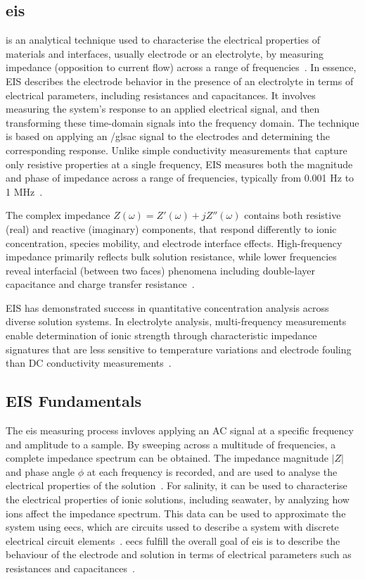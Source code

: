 \subsection{\gls{eis}}

 is an analytical technique used to characterise the electrical properties of materials and interfaces, usually electrode or an electrolyte, by measuring impedance (opposition to current flow) across a range of frequencies~\cite{canales_electrochemical_2021}.
In essence, EIS describes the electrode behavior in the presence of an electrolyte in terms of electrical parameters, including resistances and capacitances.
It involves measuring the system's response to an applied electrical signal, and then transforming these time-domain signals into the frequency domain.
The technique is based on applying an /gls{ac} signal to the electrodes and determining the corresponding response.
Unlike simple conductivity measurements that capture only resistive properties at a single frequency, EIS measures both the magnitude and phase of impedance across a range of frequencies, typically from 0.001 Hz to 1 MHz~\cite{barsoukov_impedance_2005}.

The complex impedance $Z(\omega)=Z'(\omega)+jZ''(\omega)$ contains both resistive (real) and reactive (imaginary) components, that respond differently to ionic concentration, species mobility, and electrode interface effects.
High-frequency impedance primarily reflects bulk solution resistance, while lower frequencies reveal interfacial (between two faces) phenomena including double-layer capacitance and charge transfer resistance~\cite{orazem_electrochemical_2008}.

EIS has demonstrated success in quantitative concentration analysis across diverse solution systems.
In electrolyte analysis, multi-frequency measurements enable determination of ionic strength through characteristic impedance signatures that are less sensitive to temperature variations and electrode fouling than DC conductivity measurements~\cite{barsoukov_impedance_2005}.


\subsection{EIS Fundamentals}
The \gls{eis} measuring process invloves applying an AC signal at a specific frequency and amplitude to a sample.
By sweeping across a multitude of frequencies, a complete impedance spectrum can be obtained.
The impedance magnitude $|Z|$ and phase angle $\phi$ at each frequency is recorded, and are used to analyse the electrical properties of the solution~\cite{orazem_electrochemical_2008}.
For salinity, it can be used to characterise the electrical properties of ionic solutions, including seawater, by analyzing how ions affect the impedance spectrum. 
This data can be used to approximate the system using \glspl{eec}, which are circuits ussed to describe a system with discrete electrical circuit elements~\cite{barsoukov_impedance_2005}.
\glspl{eec} fulfill the overall goal of \gls{eis} is to describe the behaviour of the electrode and solution in terms of electrical parameters such as resistances and capacitances~\cite{canales_electrochemical_2021}.

